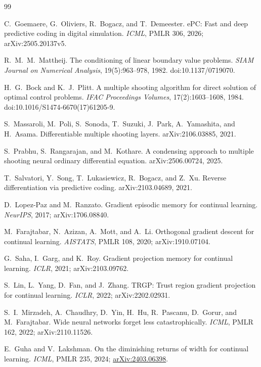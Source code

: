 \documentclass[11pt]{article}
\begin{document}
\begin{thebibliography}{99}

 C.~Goemaere, G.~Oliviers, R.~Bogacz, and
T.~Demeester.
ePC: Fast and deep predictive coding in digital simulation.
\emph{ICML}, PMLR 306, 2026; arXiv:2505.20137v5.

 R.~M.~M.~Mattheij.
The conditioning of linear boundary value problems.
\emph{SIAM Journal on Numerical Analysis}, 19(5):963--978, 1982.
doi:10.1137/0719070.

 H.~G.~Bock and K.~J.~Plitt.
A multiple shooting algorithm for direct solution of optimal control problems.
\emph{IFAC Proceedings Volumes}, 17(2):1603--1608, 1984.
doi:10.1016/S1474-6670(17)61205-9.

 S.~Massaroli, M.~Poli, S.~Sonoda, T.~Suzuki,
J.~Park, A.~Yamashita, and H.~Asama.
Differentiable multiple shooting layers. arXiv:2106.03885, 2021.

 S.~Prabhu, S.~Rangarajan, and M.~Kothare.
A condensing approach to multiple shooting neural ordinary differential equation.
arXiv:2506.00724, 2025.

 T.~Salvatori, Y.~Song, T.~Lukasiewicz,
R.~Bogacz, and Z.~Xu.
Reverse differentiation via predictive coding. arXiv:2103.04689, 2021.

 D.~Lopez-Paz and M.~Ranzato.
Gradient episodic memory for continual learning. \emph{NeurIPS}, 2017;
arXiv:1706.08840.

 M.~Farajtabar, N.~Azizan, A.~Mott, and A.~Li.
Orthogonal gradient descent for continual learning.
\emph{AISTATS}, PMLR 108, 2020; arXiv:1910.07104.

 G.~Saha, I.~Garg, and K.~Roy.
Gradient projection memory for continual learning.
\emph{ICLR}, 2021; arXiv:2103.09762.

 S.~Lin, L.~Yang, D.~Fan, and J.~Zhang.
TRGP: Trust region gradient projection for continual learning.
\emph{ICLR}, 2022; arXiv:2202.02931.

 S.~I.~Mirzadeh, A.~Chaudhry, D.~Yin,
H.~Hu, R.~Pascanu, D.~Gorur, and M.~Farajtabar.
Wide neural networks forget less catastrophically.
\emph{ICML}, PMLR 162, 2022; arXiv:2110.11526.

 E.~Guha and V.~Lakshman.
On the diminishing returns of width for continual learning.
\emph{ICML}, PMLR 235, 2024;
\href{https://arxiv.org/abs/2403.06398}{arXiv:2403.06398}.


\end{thebibliography}
\end{document}

